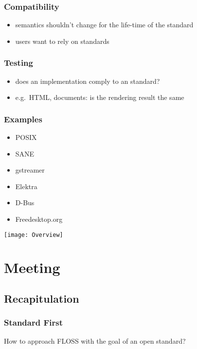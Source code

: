 \begin{frame}
	\frametitle{Compatibility}

	\begin{itemize}[<+-| alert@+>]
	\item semantics shouldn't change for the life-time of the standard
	\item users want to rely on standards
	\end{itemize}
\end{frame}

\begin{frame}
	\frametitle{Testing}

	\begin{itemize}[<+-| alert@+>]
	\item does an implementation comply to an standard?
	\item e.g.\ HTML, documents: is the rendering result the same
	\end{itemize}
\end{frame}

\begin{frame}
	\frametitle{Examples}

	\begin{itemize}[<+-| alert@+>]
	\item POSIX
	\item SANE
	\item gstreamer
	\item Elektra
	\item D-Bus
	\item Freedesktop.org
	\end{itemize}
\end{frame}

\begin{frame}
	\texttt{[image: Overview]}
\end{frame}

\section{Meeting}

\subsection{Recapitulation}


\begin{assignment}
	\frametitle{Standard First}

	How to approach FLOSS with the goal of an open standard?
\end{assignment}

